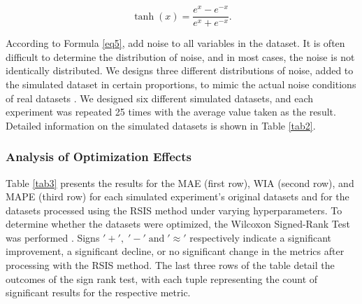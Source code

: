 \documentclass[lettersize,journal]{IEEEtran}
\begin{document}
\begin{equation}
\label{eq18}
\tanh(x) = \frac{e^x - e^{-x}}{e^x + e^{-x}}.
\end{equation}

According to Formula \eqref{eq5}, add noise to all variables in 
the dataset. It is often difficult to determine the distribution 
of noise, and in most cases, the noise is not identically 
distributed. We designs three different distributions of noise, 
added to the simulated dataset in certain proportions, to mimic 
the actual noise conditions of real datasets \cite{bib82}. We designed 
six different simulated datasets, and each experiment was 
repeated 25 times with the average value taken as the result. 
Detailed information on the simulated datasets is shown in 
Table \ref{tab2}.

\subsubsection{Analysis of Optimization Effects}
Table \ref{tab3} presents the results for the MAE (first row), WIA 
(second row), and MAPE (third row) for each simulated experiment's 
original datasets and for the datasets processed using the RSIS 
method under varying hyperparameters. To determine whether the 
datasets were optimized, the Wilcoxon Signed-Rank Test was performed 
\cite{bib83}. Signs $'+',\;{'-'}\;\text{and}\;{'}{\approx}' $ 
respectively indicate a significant improvement, a significant 
decline, or no significant change in the metrics after processing 
with the RSIS method. The last three rows of the table detail the 
outcomes of the sign rank test, with each tuple representing the 
count of significant results for the respective metric.

\end{document}
